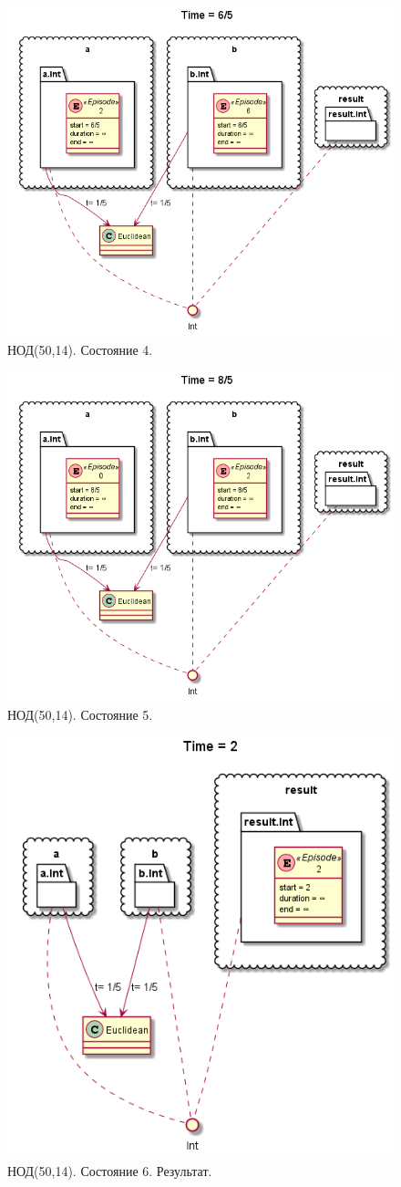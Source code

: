 \begin{figure}[h]
	\centering
	\includegraphics[width=0.7\linewidth]{images/euclidean4}
	\caption{НОД(50,14). Состояние 4.}
	\label{fig:euclidean4}
\end{figure}
\begin{figure}[h]
	\centering
	\includegraphics[width=0.7\linewidth]{images/euclidean5}
	\caption{НОД(50,14). Состояние 5.}
	\label{fig:euclidean5}
\end{figure}
\begin{figure}[h]
	\centering
	\includegraphics[width=0.5\linewidth]{images/euclidean6}
	\caption{НОД(50,14). Состояние 6. Результат.}
	\label{fig:euclidean6}
\end{figure}



